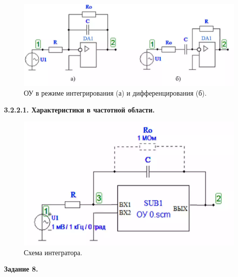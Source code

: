 \documentclass[a4paper,14pt]{extarticle}
\begin{document}
    \begin{figure}[h!]
        \begin{center}
            \includegraphics[scale=0.4]{18.png}
        \end{center}
        \vspace{-0.7cm}
        \caption{ОУ в режиме интегрирования (а) и дифференцирования (б).}
    \end{figure}

    \newpage
    \begin{center}
        \textbf{3.2.2.1. Характеристики в частотной области.}
    \end{center}

    \begin{figure}[h!]
        \begin{center}
            \includegraphics[scale=0.5]{19.png}
        \end{center}
        \vspace{-0.7cm}
        \caption{Схема интегратора.}
    \end{figure}

    \begin{center}
        \textbf{Задание 8.}
    \end{center}
\end{document}
